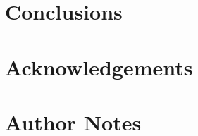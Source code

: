 \documentclass[preprint,10pt,3p]{elsarticle}\usepackage[]{graphicx}\usepackage[]{color}
\begin{document}
\section{Conclusions}
\label{sec:conclusion}






\section*{Acknowledgements}
\label{sec:acknowledgements}











\newpage
\section*{Author Notes}

\authNotes
\end{document}
